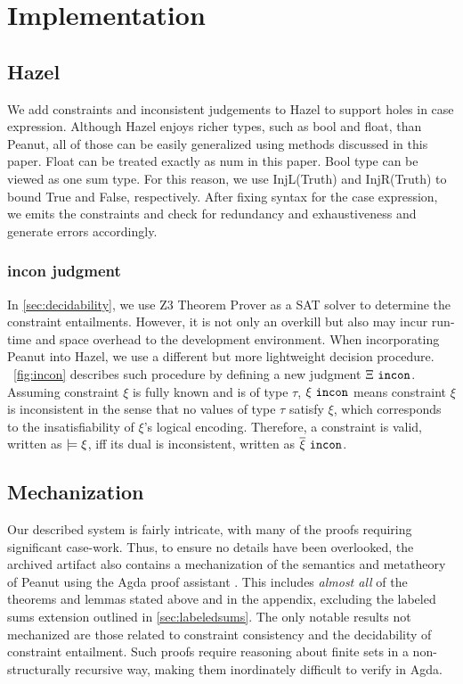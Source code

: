 \section{Implementation}
\subsection{Hazel}
We add constraints and inconsistent judgements to Hazel to support holes in case expression. Although Hazel enjoys richer types, such as bool and float, than Peanut, all of those can be easily generalized using methods discussed in this paper. Float can be treated exactly as num in this paper. Bool type can be viewed as one sum type. For this reason, we use InjL(Truth) and InjR(Truth) to bound True and False, respectively. After fixing syntax for the case expression, we emits the constraints and check for redundancy and exhaustiveness and generate errors accordingly.

\subsubsection{incon judgment}

In \autoref{sec:decidability}, we use Z3 Theorem Prover as a SAT solver to determine the constraint entailments. However, it is not only an overkill but also may incur run-time and space overhead to the development environment. When incorporating Peanut into Hazel, we use a different but more lightweight decision procedure. \figurename~\ref{fig:incon} describes such procedure by defining a new judgment $\Xi ~\mathtt{incon}$. Assuming constraint $\xi$ is fully known and is of type $\tau$, $\xi ~\mathtt{incon}$ means constraint $\xi$ is inconsistent in the sense that no values of type $\tau$ satisfy $\xi$, which corresponds to the insatisfiability of $\xi$'s logical encoding. Therefore, a constraint is valid, written as $\models \xi$, iff its dual is inconsistent, written as $\overline{\xi} ~\mathtt{incon}$.



\subsection{Mechanization}
Our described system is fairly intricate, with many of the proofs requiring significant case-work. Thus, to ensure no details have been overlooked, the archived artifact also contains a mechanization of the semantics and metatheory of Peanut using the Agda proof assistant \cite{norell:thesis}. This includes \emph{almost all} of the theorems and lemmas stated above and in the appendix, excluding the labeled sums extension outlined in \autoref{sec:labeledsums}. The only notable results not mechanized are those related to constraint consistency and the decidability of constraint entailment. Such proofs require reasoning about finite sets in a non-structurally recursive way, making them inordinately difficult to verify in Agda.

